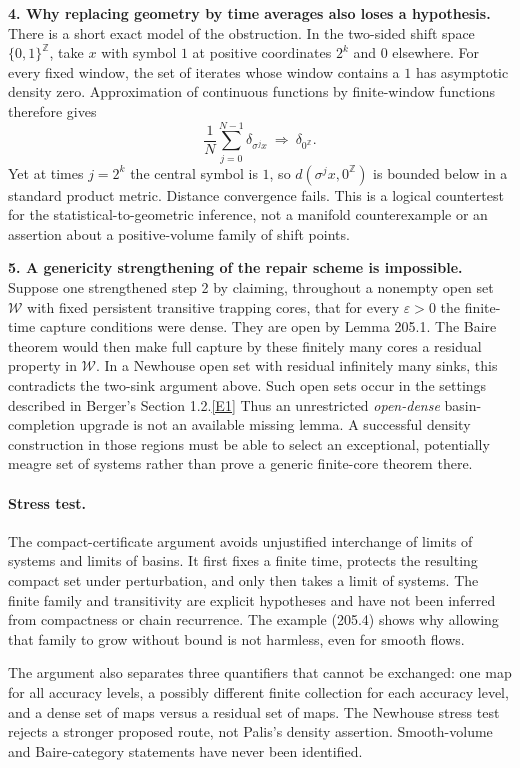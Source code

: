 \documentclass[11pt,a4paper]{article}
\newcommand{\Z}{\mathbb{Z}}
\newcommand{\eref}[2]{\hyperlink{extra:#1:#2}{[E#2]}}
\begin{document}
\textbf{4. Why replacing geometry by time averages also loses a hypothesis.}
There is a short exact model of the obstruction. In the two-sided shift
space $\{0,1\}^{\Z}$, take $x$ with symbol $1$ at positive coordinates
$2^k$ and $0$ elsewhere. For every fixed window, the set of iterates
whose window contains a $1$ has asymptotic density zero. Approximation
of continuous functions by finite-window functions therefore gives
\[
 \frac1N\sum_{j=0}^{N-1}\delta_{\sigma^j x}
 \ \Longrightarrow\ \delta_{0^{\Z}}.
\]
Yet at times $j=2^k$ the central symbol is $1$, so
$d(\sigma^j x,0^{\Z})$ is bounded below in a standard product metric.
Distance convergence fails. This is a logical countertest for the
statistical-to-geometric inference, not a manifold counterexample or
an assertion about a positive-volume family of shift points.

\textbf{5. A genericity strengthening of the repair scheme is impossible.}
Suppose one strengthened step 2 by claiming, throughout a nonempty open
set $\mathcal W$ with fixed persistent transitive trapping cores, that
for every $\varepsilon>0$ the finite-time capture conditions were dense.
They are open by Lemma 205.1. The Baire theorem would then make full
capture by these finitely many cores a residual property in
$\mathcal W$. In a Newhouse open set with residual infinitely many sinks,
this contradicts the two-sink argument above. Such open sets occur in
the settings described in Berger's Section 1.2.\eref{205}{1}
Thus an unrestricted \emph{open-dense} basin-completion upgrade is not
an available missing lemma. A successful density construction in those
regions must be able to select an exceptional, potentially meagre set
of systems rather than prove a generic finite-core theorem there.

\paragraph{Stress test.}
The compact-certificate argument avoids unjustified interchange of
limits of systems and limits of basins. It first fixes a finite time,
protects the resulting compact set under perturbation, and only then
takes a limit of systems. The finite family and transitivity are explicit
hypotheses and have not been inferred from compactness or chain
recurrence. The example (205.4) shows why allowing that family to grow
without bound is not harmless, even for smooth flows.

The argument also separates three quantifiers that cannot be exchanged:
one map for all accuracy levels, a possibly different finite collection
for each accuracy level, and a dense set of maps versus a residual set
of maps. The Newhouse stress test rejects a stronger proposed route,
not Palis's density assertion. Smooth-volume and Baire-category
statements have never been identified.
\end{document}
